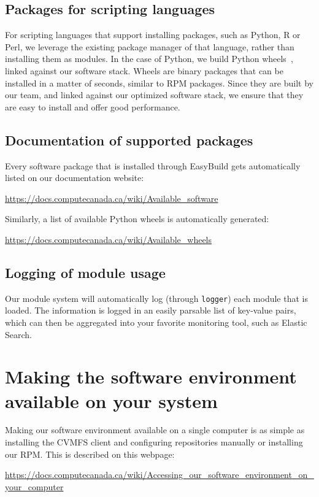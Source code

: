 \documentclass[sigconf]{acmart}
\begin{document}
\subsection{Packages for scripting languages}
\label{sub:Packages_for_scripting_languages}
For scripting languages that support installing packages, such as Python, R or Perl, we leverage the existing package manager of that language, rather than installing them as modules. In the case of Python, we build Python wheels~\cite{Wheels}, linked against our software stack. Wheels are binary packages that can be installed in a matter of seconds, similar to RPM packages. Since they are built by our team, and linked against our optimized software stack, we ensure that they are easy to install and offer good performance.

\subsection{Documentation of supported packages}
\label{sub:Documentation}
Every software package that is installed through EasyBuild gets automatically listed on our documentation website:
\begin{center}
    \url{https://docs.computecanada.ca/wiki/Available_software}
\end{center}
Similarly, a list of available Python wheels is automatically generated:
\begin{center}
\url{https://docs.computecanada.ca/wiki/Available_wheels}    
\end{center}

\subsection{Logging of module usage}
\label{sub:Logging}
Our module system will automatically log (through \texttt{logger}) each module that is loaded. The information is logged in an easily parsable list of key-value pairs, which can then be aggregated into your favorite monitoring tool, such as Elastic Search. 

\section{Making the software environment available on your system}
\label{sec:Making_it_available}
Making our software environment available on a single computer is as simple as installing the CVMFS client and configuring repositories manually or installing our RPM. This is described on this webpage:
\begin{center}
    \url{https://docs.computecanada.ca/wiki/Accessing_our_software_environment_on_your_computer}
\end{center}
\end{document}
